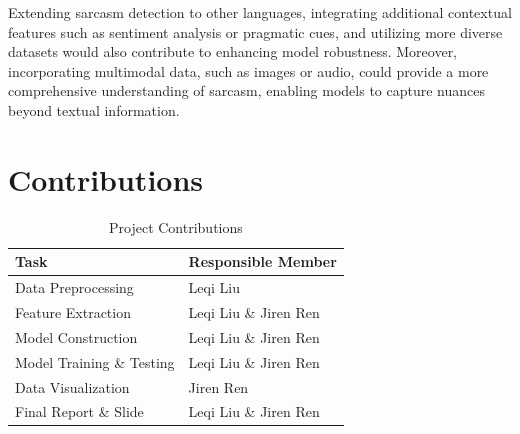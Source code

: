 \documentclass[11pt]{article}
\begin{document}
Extending sarcasm detection to other languages, integrating additional contextual features such as sentiment analysis or pragmatic cues, and utilizing more diverse datasets would also contribute to enhancing model robustness. Moreover, incorporating multimodal data, such as images or audio, could provide a more comprehensive understanding of sarcasm, enabling models to capture nuances beyond textual information.

\section{Contributions}

\begin{table}[ht]
\centering
\begin{tabular}{|l|l|}
\hline
\textbf{Task}              & \textbf{Responsible Member} \\ \hline
Data Preprocessing         & Leqi Liu                    \\ \hline
Feature Extraction         & Leqi Liu \& Jiren Ren       \\ \hline
Model Construction         & Leqi Liu \& Jiren Ren       \\ \hline
Model Training \& Testing  & Leqi Liu \& Jiren Ren       \\ \hline
Data Visualization         & Jiren Ren                   \\ \hline
Final Report \& Slide      & Leqi Liu \& Jiren Ren       \\ \hline
\end{tabular}
\caption{Project Contributions}
\end{table}


%
%
\end{document}

